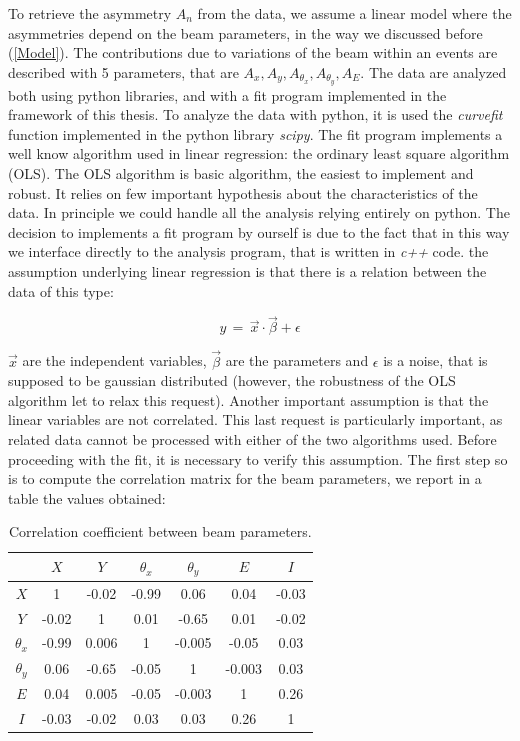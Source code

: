 To retrieve the asymmetry $A_{n}$ from the data, we assume a linear model where the asymmetries depend on the beam parameters, in the way we discussed before (\ref{Model}). The contributions due to variations of the beam within an events are described with 5 parameters, that are  $A_{x},A_{y},A_{\theta_{x}},A_{\theta_{y}},A_{E}$.
The data are analyzed both using python libraries, and with a fit program implemented in the framework of this thesis. To analyze the data with python, it is used the \textit{curvefit} function implemented in the python library \textit{scipy}.
The fit program implements a well know algorithm used in linear regression: the ordinary least square algorithm (OLS).
The OLS algorithm is basic algorithm, the easiest to implement and robust. It relies on few important hypothesis about the characteristics of the data. In principle we could handle all the analysis relying entirely on python. The decision to implements a fit program by ourself is due to the fact that in this way we interface directly to the analysis program, that is written in \textit{c++} code. 
the assumption underlying linear regression is that there is a relation between the data of this type:

\begin{equation}
 y \, = \, \vec{x} \cdot \vec{\beta} + \epsilon
\end{equation}

$\vec{x}$ are the independent variables, $\vec{\beta}$ are the parameters and $\epsilon$ is a noise, that is supposed to be gaussian distributed (however, the robustness of the OLS algorithm let to relax this request). Another important assumption is that the linear variables are not correlated. 
This last request is particularly important, as related data cannot be processed with either of the two algorithms used.
Before proceeding with the fit, it is necessary to verify this assumption.
The first step so is to compute the correlation matrix for the beam parameters, we report in a table the values obtained: 
\medskip
\begin{table}[!h]
\centering
\begin{tabular}{c|cccccc}
\hline 
             & $X$ & $Y$ & $\theta_{x}$ & $\theta_{y}$ & $E$ & $I$\\ 
\hline 
$X$            & 1 & -0.02 & -0.99 & 0.06 & 0.04  & -0.03\\ 

$Y$            & -0.02 & 1 & 0.01 & -0.65 & 0.01  & -0.02\\ 

$\theta_{x}$ & -0.99 & 0.006 & 1  & -0.005 & -0.05 & 0.03\\ 

$\theta_{y}$ & 0.06 & -0.65 & -0.05 & 1 & -0.003  & 0.03\\ 
 
$E$            & 0.04 & 0.005 & -0.05  & -0.003  & 1 & 0.26\\ 
 
$I$            & -0.03 & -0.02 & 0.03  & 0.03 & 0.26 & 1\\ 
\hline
\end{tabular}
\caption{Correlation coefficient between beam parameters.} 
\end{table}

